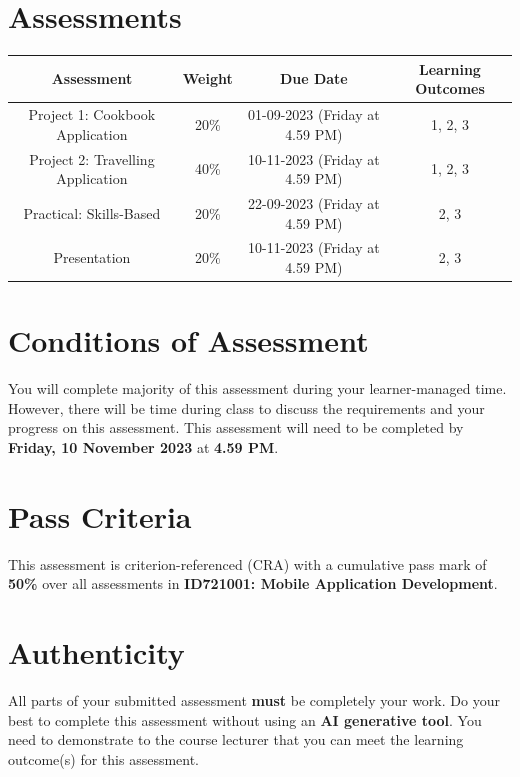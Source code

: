 \documentclass{article}
\begin{document}
\section*{Assessments}
\renewcommand{\arraystretch}{1.5}
\begin{tabular}{|c|c|c|c|}
	\hline
	\textbf{Assessment} & \textbf{Weight} & \textbf{Due Date}    & \textbf{Learning Outcomes} \\ \hline
	Project 1: Cookbook Application            & 20\%            & 01-09-2023 (Friday at 4.59 PM)  & 1, 2, 3                    \\ \hline
	Project 2: Travelling Application            & 40\%            & 10-11-2023 (Friday at 4.59 PM)  & 1, 2, 3                    \\ \hline
	Practical: Skills-Based           & 20\%            & 22-09-2023 (Friday at 4.59 PM)  & 2, 3                    \\ \hline
	Presentation       & 20\%            & 10-11-2023 (Friday at 4.59 PM) & 2, 3                       \\ \hline
\end{tabular}

\section*{Conditions of Assessment}
You will complete majority of this assessment during your learner-managed time. However, there will be time during class to discuss the requirements and your progress on this assessment. This assessment will need to be completed by \textbf{Friday, 10 November 2023} at \textbf{4.59 PM}.

\section*{Pass Criteria}
This assessment is criterion-referenced (CRA) with a cumulative pass mark of \textbf{50\%} over all assessments in \textbf{ID721001: Mobile Application Development}.

\section*{Authenticity}
All parts of your submitted assessment \textbf{must} be completely your work. Do your best to complete this assessment without using an \textbf{AI generative tool}. You need to demonstrate to the course lecturer that you can meet the learning outcome(s) for this assessment. \\
 
\end{document}
